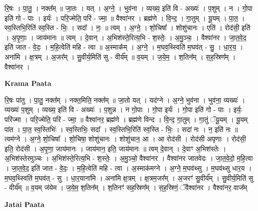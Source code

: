 \documentclass[17pt]{extarticle}
\begin{document}
रि॒षः । पा॒तु॒ । नक्त᳚म् ॥ जा॒तः । यत् । अ॒ग्ने॒ । भुव॑ना । व्यख्य॒ इति॑ वि - अख्यः॑ । प॒शुम् । न । गो॒पा इति॑ गो - पाः । इर्यः॑ । परि॒ज्मेति॒ परि॑ - ज्मा॒ ॥ वैश्वा॑नर । ब्रह्म॑णे । वि॒न्द॒ । गा॒तुम् । यू॒यम् । पा॒त॒ । स्व॒स्तिभि॒रिति॑ स्व॒स्ति - भिः॒ । सदा᳚ । नः॒ ॥ त्वम् । अ॒ग्ने॒ । शो॒चिषा᳚ । शोशु॑चानः । एति॑ । रोद॑सी॒ इति॑ । अ॒पृ॒णाः॒ । जाय॑मानः ॥ त्वम् । दे॒वान् । अ॒भिश॑स्ते॒रित्य॒भि - श॒स्तेः॒ । अ॒मु॒ञ्चः॒ । वैश्वा॑नर । जा॒त॒वे॒द॒ इति॑ जात - वे॒दः॒ । म॒हि॒त्वेति॑ महि - त्वा ॥ अ॒स्माक᳚म् । अ॒ग्ने॒ । म॒घव॒थ्स्विति॑ म॒घव॑त् - सु॒ । धा॒र॒य॒ । अना॑मि । क्ष॒त्रम् । अ॒जर᳚म् । सु॒वीर्य॒मिति॑ सु - वीर्य᳚म् ॥ व॒यम् । ज॒ये॒म॒ । श॒तिन᳚म् । स॒ह॒स्रिण᳚म् । वैश्वा॑नर ।  \newline


\textbf{Krama Paata} \newline

रि॒षः पा॑तु । पा॒तु॒ नक्त᳚म् । नक्त॒मिति॒ नक्त᳚म् ॥ जा॒तो यत् । यद॑ग्ने । अ॒ग्ने॒ भुव॑ना । भुव॑ना॒ व्यख्यः॑ । व्यख्यः॑ प॒शुम् । व्यख्य॒ इति॑ वि - अख्यः॑ । प॒शुन्न । न गो॒पाः । गो॒पा इर्यः॑ । गो॒पा इति॑ गो - पाः । इर्यः॒ परि॑ज्मा । परि॒ज्मेति॒ परि॑ - ज्मा॒ ॥ वैश्वा॑नर॒ ब्रह्म॑णे । ब्रह्म॑णे विन्द । वि॒न्द॒ गा॒तुम् । गा॒तुं ॅयू॒यम् । यू॒यम् पा॑त । पा॒त॒ स्व॒स्तिभिः॑ । स्व॒स्तिभिः॒ सदा᳚ । स्व॒स्तिभि॒रिति॑ स्व॒स्ति - भिः॒ । सदा॑ नः । न॒ इति॑ नः ॥ त्वम॑ग्ने । अ॒ग्ने॒ शो॒चिषा᳚ । शो॒चिषा॒ शोशु॑चानः । शोशु॑चान॒ आ । आ रोद॑सी । रोद॑सी अपृणाः । रोद॑सी॒ इति॒ रोद॑सी । अ॒पृ॒णा॒ जाय॑मानः । जाय॑मान॒ इति॒ जाय॑मानः ॥ त्वम् दे॒वान् । दे॒वाꣳ अ॒भिश॑स्तेः । अ॒भिश॑स्तेरमुञ्चः । अ॒भिश॑स्ते॒रित्य॒भि - श॒स्तेः॒ । अ॒मु॒ञ्चो॒ वैश्वा॑नर । वैश्वा॑नर जातवेदः । जा॒त॒वे॒दो॒ म॒हि॒त्वा । जा॒त॒वे॒द॒ इति॑ जात - वे॒दः॒ । म॒हि॒त्वेति॑ महि - त्वा । अ॒स्माक॑मग्ने । अ॒ग्ने॒ म॒घव॑थ्सु । म॒घव॑थ्सु धार॒य । म॒घव॒थ्स्विति॑ म॒घव॑त् - सु । धा॒र॒याना॑मि । अना॑मि क्ष॒त्रम् । क्ष॒त्रम॒जर᳚म् । अ॒जरꣳ॑ सु॒वीर्य᳚म् । सु॒वीर्य॒मिति॑ सु - वीर्य᳚म् ॥ व॒यम् ज॑येम । ज॒ये॒म॒ श॒तिन᳚म् । श॒तिनꣳ॑ सह॒स्रिण᳚म् । स॒ह॒स्रिणं॒ ॅवैश्वा॑नर । वैश्वा॑नर॒ वाज᳚म् \newline

\textbf{Jatai Paata} \newline
\end{document}
